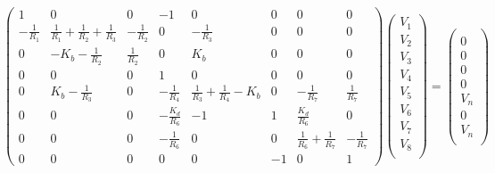\begin{equation}
  \begin{pmatrix}
    1 & 0 & 0 & -1 & 0 & 0 & 0 & 0 \\
    -\frac{1}{R_1} & \frac{1}{R_1}+\frac{1}{R_2}+\frac{1}{R_3} & -\frac{1}{R_2} & 0 & -\frac{1}{R_3} & 0 & 0 & 0 \\
    0 & -K_b-\frac{1}{R_2} & \frac{1}{R_2} & 0 & K_b & 0 & 0 & 0 \\
    0 & 0 & 0 & 1 & 0 & 0 & 0 & 0 \\
    0 & K_b-\frac{1}{R_3} & 0 & -\frac{1}{R_4} & \frac{1}{R_3}+\frac{1}{R_4}-K_b & 0 & -\frac{1}{R_7} & \frac{1}{R_7} \\
    0 & 0 & 0 & -\frac{K_d}{R_6} & -1 & 1 & \frac{K_d}{R_6} & 0 \\
    0 & 0 & 0 & -\frac{1}{R_6} & 0 & 0 & \frac{1}{R_6}+\frac{1}{R_7} & -\frac{1}{R_7} \\
    0 & 0 & 0 & 0 & 0 & -1 & 0 & 1
  \end{pmatrix}
  \begin{pmatrix}
    V_1  \\
    V_2  \\
    V_3  \\
    V_4  \\
    V_5  \\
    V_6  \\
    V_7  \\
    V_8  \\
  \end{pmatrix}
  =
  \begin{pmatrix}
     \\
    0   \\
    0   \\
    0   \\
    0   \\
    V_n  \\
    0   \\
    V_n   \\
  \end{pmatrix}
  \label{eq:Exercise1LinearSystem}
\end{equation}

